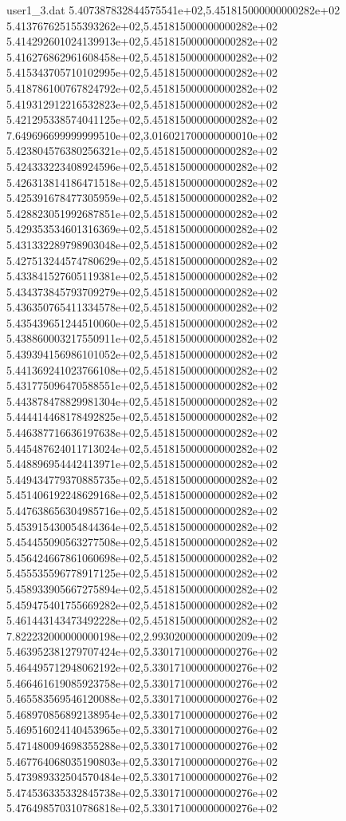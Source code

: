 \begin{filecontents}{user1_3.dat}
5.407387832844575541e+02,5.451815000000000282e+02
5.413767625155393262e+02,5.451815000000000282e+02
5.414292601024139913e+02,5.451815000000000282e+02
5.416276862961608458e+02,5.451815000000000282e+02
5.415343705710102995e+02,5.451815000000000282e+02
5.418786100767824792e+02,5.451815000000000282e+02
5.419312912216532823e+02,5.451815000000000282e+02
5.421295338574041125e+02,5.451815000000000282e+02
7.649696699999999510e+02,3.016021700000000010e+02
5.423804576380256321e+02,5.451815000000000282e+02
5.424333223408924596e+02,5.451815000000000282e+02
5.426313814186471518e+02,5.451815000000000282e+02
5.425391678477305959e+02,5.451815000000000282e+02
5.428823051992687851e+02,5.451815000000000282e+02
5.429353534601316369e+02,5.451815000000000282e+02
5.431332289798903048e+02,5.451815000000000282e+02
5.427513244574780629e+02,5.451815000000000282e+02
5.433841527605119381e+02,5.451815000000000282e+02
5.434373845793709279e+02,5.451815000000000282e+02
5.436350765411334578e+02,5.451815000000000282e+02
5.435439651244510060e+02,5.451815000000000282e+02
5.438860003217550911e+02,5.451815000000000282e+02
5.439394156986101052e+02,5.451815000000000282e+02
5.441369241023766108e+02,5.451815000000000282e+02
5.431775096470588551e+02,5.451815000000000282e+02
5.443878478829981304e+02,5.451815000000000282e+02
5.444414468178492825e+02,5.451815000000000282e+02
5.446387716636197638e+02,5.451815000000000282e+02
5.445487624011713024e+02,5.451815000000000282e+02
5.448896954442413971e+02,5.451815000000000282e+02
5.449434779370885735e+02,5.451815000000000282e+02
5.451406192248629168e+02,5.451815000000000282e+02
5.447638656304985716e+02,5.451815000000000282e+02
5.453915430054844364e+02,5.451815000000000282e+02
5.454455090563277508e+02,5.451815000000000282e+02
5.456424667861060698e+02,5.451815000000000282e+02
5.455535596778917125e+02,5.451815000000000282e+02
5.458933905667275894e+02,5.451815000000000282e+02
5.459475401755669282e+02,5.451815000000000282e+02
5.461443143473492228e+02,5.451815000000000282e+02
7.822232000000000198e+02,2.993020000000000209e+02
5.463952381279707424e+02,5.330171000000000276e+02
5.464495712948062192e+02,5.330171000000000276e+02
5.466461619085923758e+02,5.330171000000000276e+02
5.465583569546120088e+02,5.330171000000000276e+02
5.468970856892138954e+02,5.330171000000000276e+02
5.469516024140453965e+02,5.330171000000000276e+02
5.471480094698355288e+02,5.330171000000000276e+02
5.467764068035190803e+02,5.330171000000000276e+02
5.473989332504570484e+02,5.330171000000000276e+02
5.474536335332845738e+02,5.330171000000000276e+02
5.476498570310786818e+02,5.330171000000000276e+02

\end{filecontents}
